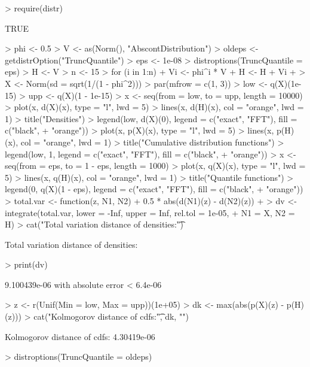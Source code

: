 \documentclass[11pt]{article}
\begin{document}
\begin{Schunk}
\begin{Sinput}
> require(distr)
\end{Sinput}
\begin{Soutput}
[1] TRUE
\end{Soutput}
\begin{Sinput}
> phi <- 0.5
> V <- as(Norm(), "AbscontDistribution")
> oldeps <- getdistrOption("TruncQuantile")
> eps <- 1e-08
> distroptions(TruncQuantile = eps)
> H <- V
> n <- 15
> for (i in 1:n) {
+     Vi <- phi^i * V
+     H <- H + Vi
+ }
> X <- Norm(sd = sqrt(1/(1 - phi^2)))
> par(mfrow = c(1, 3))
> low <- q(X)(1e-15)
> upp <- q(X)(1 - 1e-15)
> x <- seq(from = low, to = upp, length = 10000)
> plot(x, d(X)(x), type = "l", lwd = 5)
> lines(x, d(H)(x), col = "orange", lwd = 1)
> title("Densities")
> legend(low, d(X)(0), legend = c("exact", "FFT"), fill = c("black", 
+     "orange"))
> plot(x, p(X)(x), type = "l", lwd = 5)
> lines(x, p(H)(x), col = "orange", lwd = 1)
> title("Cumulative distribution functions")
> legend(low, 1, legend = c("exact", "FFT"), fill = c("black", 
+     "orange"))
> x <- seq(from = eps, to = 1 - eps, length = 1000)
> plot(x, q(X)(x), type = "l", lwd = 5)
> lines(x, q(H)(x), col = "orange", lwd = 1)
> title("Quantile functions")
> legend(0, q(X)(1 - eps), legend = c("exact", "FFT"), fill = c("black", 
+     "orange"))
> total.var <- function(z, N1, N2) {
+     0.5 * abs(d(N1)(z) - d(N2)(z))
+ }
> dv <- integrate(total.var, lower = -Inf, upper = Inf, rel.tol = 1e-05, 
+     N1 = X, N2 = H)
> cat("Total variation distance of densities:\t")
\end{Sinput}
\begin{Soutput}
Total variation distance of densities:	
\end{Soutput}
\begin{Sinput}
> print(dv)
\end{Sinput}
\begin{Soutput}
9.100439e-06 with absolute error < 6.4e-06
\end{Soutput}
\begin{Sinput}
> z <- r(Unif(Min = low, Max = upp))(1e+05)
> dk <- max(abs(p(X)(z) - p(H)(z)))
> cat("Kolmogorov distance of cdfs:\t", dk, "\n")
\end{Sinput}
\begin{Soutput}
Kolmogorov distance of cdfs:	 4.30419e-06 
\end{Soutput}
\begin{Sinput}
> distroptions(TruncQuantile = oldeps)
\end{Sinput}
\end{Schunk}
\end{document}
